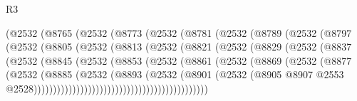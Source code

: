 \begin{lexlean}{R3}
\begin{coremodule}
                  (@2532
                    (@8765
                      (@2532
                        (@8773
                          (@2532
                            (@8781
                              (@2532
                                (@8789
                                  (@2532
                                    (@8797
                                      (@2532
                                        (@8805
                                          (@2532
                                            (@8813
                                              (@2532
                                                (@8821
                                                  (@2532
                                                    (@8829
                                                      (@2532
                                                        (@8837
                                                          (@2532
                                                            (@8845
                                                              (@2532
                                                                (@8853
                                                                  (@2532
                                                                    (@8861
                                                                      (@2532
                                                                        (@8869
                                                                          (@2532
                                                                            (@8877
                                                                              (@2532
                                                                                (@8885
                                                                                  (@2532
                                                                                    (@8893
                                                                                      (@2532
                                                                                        (@8901
                                                                                          (@2532
                                                                                            (@8905
                                                                                              @8907
                                                                                              @2553
                                                                                              @2528)))))))))))))))))))))))))))))))))))))))))))))

\end{coremodule}
\end{lexlean}
